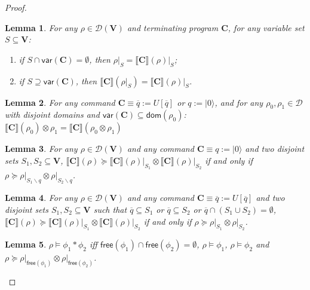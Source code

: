 \documentclass[conference,compsoc, 10pt]{IEEEtran}
\newtheorem{lemma}{Lemma}[section]
\newcommand {\qbar} {{\overline{q}}}
\newcommand {\qI} {{q:=|0\rangle}}
\newcommand {\qU} {{\overline{q}:=U[\overline{q}]}}
\newcommand {\cD } {{\mathcal{D}}}
\newcommand {\dom }[1] {{\mathsf{dom}\!\left(#1\right)}}
\newcommand {\free }[1] {{\mathsf{free}\left(#1\right)}}
\newcommand {\rt }[2] {{\left.{#1}\right|_{#2}}}
\newcommand {\vars } {\mathbf{V}}
\newcommand {\var } {\mathsf{var}}
\newcommand {\prog } {{\mathbf{C}}}
\newcommand {\sem}[1] {\llbracket#1\rrbracket}
\begin{document}
\begin{appendices}
\begin{proof}
			\begin{lemma}
				\label{lem sound proof 1}
				For any $\rho\in\cD(\vars)$ and terminating program $\prog$, for any variable set $S\subseteq\vars$:
				\begin{enumerate}
					\item if $S\cap\var(\prog) = \emptyset$, then $\rt{\rho}{S} = \rt{\sem{\prog}(\rho)}{S}$;
					\item if $S\supseteq\var(\prog)$, then $\sem{\prog}(\rt{\rho}{S}) = \rt{\sem{\prog}(\rho)}{S}$.
				\end{enumerate} 
			\end{lemma}
			\begin{lemma}
				\label{lem sound proof 5}
				For any command $\prog\equiv \qU$ or $\qI$, and for any $\rho_0,\rho_1\in\cD$ with disjoint domains and $\var(\prog)\subseteq\dom{\rho_0}$: $\sem{\prog}(\rho_0)\otimes\rho_1 = \sem{\prog}(\rho_0\otimes\rho_1)$
			\end{lemma}
			\begin{lemma}
				\label{lem sound proof 6}
				For any $\rho\in\cD(\vars)$ and any command $\prog\equiv \qI$ and two disjoint sets $S_1,S_2\subseteq\vars$, $\sem{\prog}(\rho)\succeq\rt{\sem{\prog}(\rho)}{S_1}\otimes\rt{\sem{\prog}(\rho)}{S_2}$ if and only if $\rho\succeq\rt{\rho}{S_1\backslash q}\otimes\rt{\rho}{S_2\backslash q}$.
			\end{lemma}
			\begin{lemma}
				\label{lem sound proof 7}
				For any $\rho\in\cD(\vars)$ and any command $\prog\equiv \qU$ and two disjoint sets $S_1,S_2\subseteq\vars$ such that $\qbar\subseteq S_1$ or $\qbar\subseteq S_2$ or $\qbar\cap(S_1\cup S_2) = \emptyset$, $\sem{\prog}(\rho)\succeq\rt{\sem{\prog}(\rho)}{S_1}\otimes\rt{\sem{\prog}(\rho)}{S_2}$ if and only if $\rho\succeq\rt{\rho}{S_1}\otimes\rt{\rho}{S_2}$.
			\end{lemma}	
			\begin{lemma}
				\label{lem sound proof 8}
				$\rho\models\phi_1\ast\phi_2$ iff $\free{\phi_1}\cap\free{\phi_2} = \emptyset$, $\rho\models\phi_1$, $\rho\models\phi_2$ and $\rho\succeq\rt{\rho}{\free{\phi_1}}\otimes\rt{\rho}{\free{\phi_2}}$.
			\end{lemma}	
			

\end{proof}
\end{appendices}
\end{document}
